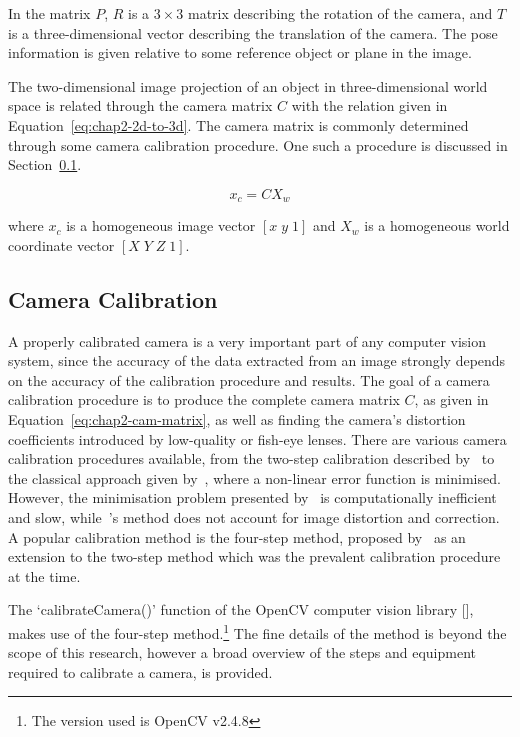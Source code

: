 In the matrix $P$, $R$ is a $3\times3$ matrix describing the rotation of the camera, and $T$ is a three-dimensional vector describing the translation of the camera. The pose information is given relative to some reference object or plane in the image. 

The two-dimensional image projection of an object in three-dimensional world space is related through the camera matrix $C$ with the relation given in Equation~\ref{eq:chap2-2d-to-3d}. The camera matrix is commonly determined through some camera calibration procedure. One such a procedure is discussed in Section~\ref{sec:chap2-cam-calibration}.

\begin{equation}
  \label{eq:chap2-2d-to-3d}
  x_c
  = C
  X_w
\end{equation}

where $x_c$ is a homogeneous image vector $[x\;y\;1]$ and $X_w$ is a homogeneous world coordinate vector $[X\;Y\;Z\;1]$. 

\subsection{Camera Calibration}
\label{sec:chap2-cam-calibration}

A properly calibrated camera is a very important part of any computer vision system, since the accuracy of the data extracted from an image strongly depends on the accuracy of the calibration procedure and results. The goal of a camera calibration procedure is to produce the complete camera matrix $C$, as given in Equation~\ref{eq:chap2-cam-matrix}, as well as finding the camera's distortion coefficients introduced by low-quality or fish-eye lenses. There are various camera calibration procedures available, from the two-step calibration described by~\cite{melen1994geometrical} to the classical approach given by~\cite{slama1980manual}, where a non-linear error function is minimised. However, the minimisation problem presented by~\citeauthor{slama1980manual} is computationally inefficient and slow, while~\citeauthor{melen1994geometrical}'s method does not account for image distortion and correction. A popular calibration method is the four-step method, proposed by~\cite{heikkila1997four} as an extension to the two-step method which was the prevalent calibration procedure at the time.

The `calibrateCamera()' function of the OpenCV computer vision library [\cite{bradski2000opencv}], makes use of the four-step method.\footnote{The version used is OpenCV v2.4.8} The fine details of the method is beyond the scope of this research, however a broad overview of the steps and equipment required to calibrate a camera, is provided. 

